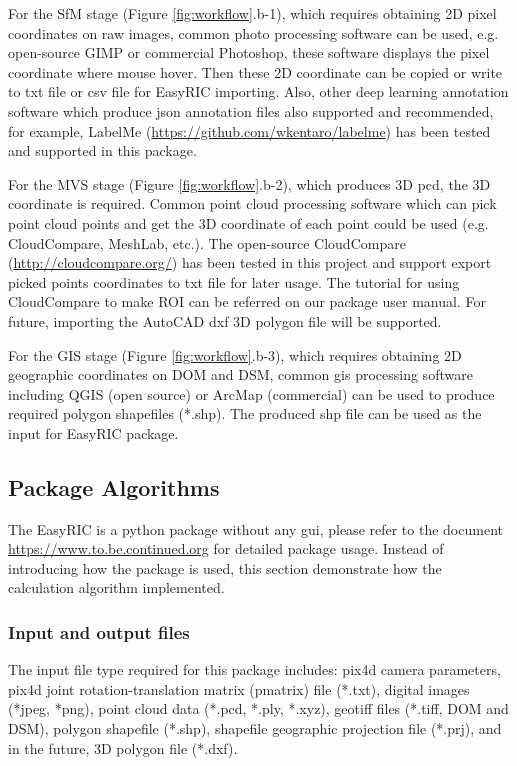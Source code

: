 \documentclass{configs/bmcart}
\begin{document}
For the SfM stage (Figure \ref{fig:workflow}.b-1), which requires obtaining 2D pixel coordinates on raw images, common photo processing software can be used, e.g. open-source GIMP or commercial Photoshop, these software displays the pixel coordinate where mouse hover. Then these 2D coordinate can be copied or write to txt file or csv file for EasyRIC importing. Also, other deep learning annotation software which produce json annotation files also supported and recommended, for example, LabelMe (\url{https://github.com/wkentaro/labelme}) has been tested and supported in this package.

For the MVS stage (Figure \ref{fig:workflow}.b-2), which produces 3D \acrfull*{pcd}, the 3D coordinate is required. Common point cloud processing software which can pick point cloud points and get the 3D coordinate of each point could be used (e.g. CloudCompare, MeshLab, etc.). The open-source CloudCompare (\url{http://cloudcompare.org/}) has been tested in this project and support export picked points coordinates to txt file for later usage. The tutorial for using CloudCompare to make ROI can be referred on our package user manual. For future, importing the AutoCAD dxf 3D polygon file will be supported.

For the GIS stage (Figure \ref{fig:workflow}.b-3), which requires obtaining 2D geographic coordinates on DOM and DSM, common \acrfull*{gis} processing software including QGIS (open source) or ArcMap (commercial) can be used to produce required polygon shapefiles (*.shp). The produced shp file can be used as the input for EasyRIC package.

\subsection*{Package Algorithms}
The EasyRIC is a python package without any \acrfull*{gui}, please refer to the document \url{https://www.to.be.continued.org} for detailed package usage. Instead of introducing how the package is used, this section demonstrate how the calculation algorithm implemented.

\subsubsection*{Input and output files}
The input file type required for this package includes: pix4d camera parameters, pix4d joint rotation-translation matrix (pmatrix) file (*.txt), digital images (*jpeg, *png), point cloud data (*.pcd, *.ply, *.xyz), geotiff files (*.tiff, DOM and DSM), polygon shapefile (*.shp), shapefile geographic projection file (*.prj), and in the future, 3D polygon file (*.dxf).
\end{document}
